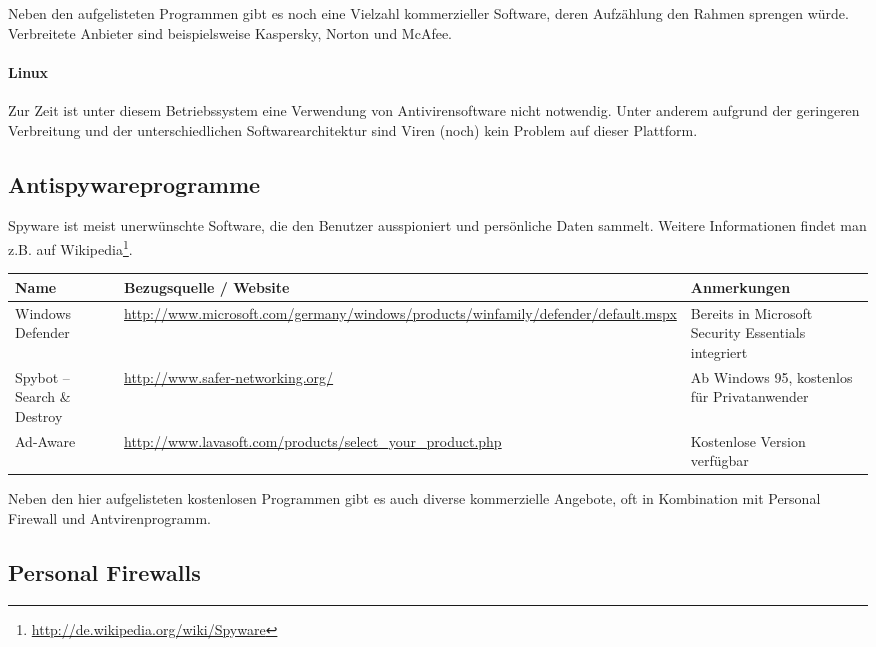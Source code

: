 \documentclass[a4paper,12pt]{scrartcl}
\begin{document}
Neben den aufgelisteten Programmen gibt es noch eine Vielzahl kommerzieller Software, deren Aufzählung den Rahmen sprengen würde. Verbreitete Anbieter sind beispielsweise Kaspersky, Norton und McAfee.

\paragraph*{Linux}

Zur Zeit ist unter diesem Betriebssystem eine Verwendung von Antivirensoftware nicht notwendig. Unter anderem aufgrund der geringeren Verbreitung und der unterschiedlichen Softwarearchitektur sind Viren (noch) kein Problem auf dieser Plattform.

\pagebreak

\subsection*{Antispywareprogramme}

Spyware ist meist unerwünschte Software, die den Benutzer ausspioniert und persönliche Daten sammelt. Weitere Informationen findet man z.B. auf Wikipedia\footnote{\url{http://de.wikipedia.org/wiki/Spyware}}.

\begin{center}
  \begin{tabularx}{\linewidth}{|p{.18\linewidth}Xp{.3\linewidth}|}
    \hline
    Name & Bezugsquelle / Website & Anmerkungen\\
    \hline \hline
    Windows Defender & \url{http://www.microsoft.com/germany/windows/products/winfamily/defender/default.mspx} & Bereits in Microsoft Security Essentials integriert\\
    \hline
    Spybot – Search \& Destroy & \url{http://www.safer-networking.org/} & Ab Windows 95, kostenlos für Privatanwender\\
    \hline
    Ad-Aware & \url{http://www.lavasoft.com/products/select\_your\_product.php} & Kostenlose Version verfügbar\\
    \hline
  \end{tabularx}
\end{center}

Neben den hier aufgelisteten kostenlosen Programmen gibt es auch diverse kommerzielle Angebote, oft in Kombination mit Personal Firewall und Antvirenprogramm.

\subsection*{Personal Firewalls}
\end{document}
